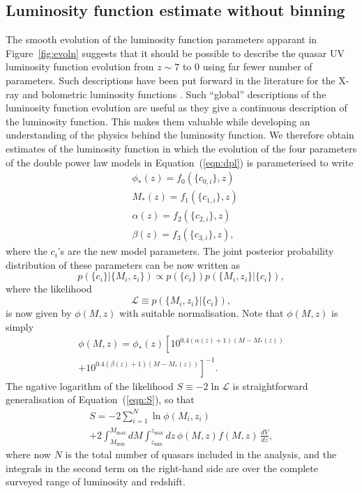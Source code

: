 \documentclass[a4paper,fleqn,usenatbib]{mnras}
\begin{document}
\subsection{Luminosity function estimate without binning}

The smooth evolution of the luminosity function parameters apparant in
Figure~\ref{fig:evoln} suggests that it should be possible to describe
the quasar UV luminosity function evolution from $z\sim 7$ to $0$
using far fewer number of parameters.  Such descriptions have been put
forward in the literature for the X-ray and bolometric luminosity
functions \citep[e.g.,][]{2007ApJ...654..731H, 2015MNRAS.451.1892A}.
Such ``global'' descriptions of the luminosity function evolution are
useful as they give a continuous description of the luminosity
function.  This makes them valuable while developing an understanding
of the physics behind the luminosity function. We therefore obtain
estimates of the luminosity function in which the evolution of the
four parameters of the double power law models in
Equation~(\ref{eqn:dpl}) is parameterised to write
\begin{align}
  &\phi_*(z) = f_0(\{c_{0,i}\}, z)\nonumber\\
  &M_*(z) = f_1(\{c_{1,i}\}, z)\nonumber\\
  &\alpha(z) = f_2(\{c_{2,i}\}, z)\nonumber\\
  &\beta(z) = f_3(\{c_{3,i}\}, z),
\label{eqn:global}
\end{align}
where the $c_i$'s are the new model parameters.  The joint posterior
probability distribution of these parameters can be now written as
\begin{equation}
  p(\{c_i\} | \{M_i, z_i\}) \propto p(\{c_i\})p(\{M_i, z_i\} | \{c_i\}),
\end{equation}
where the likelihood 
\begin{equation}
  \mathcal{L}\equiv p(\{M_i, z_i\} | \{c_i\}),
\end{equation}
is now given by $\phi(M,z)$ with suitable normalisation.  Note that
$\phi(M,z)$ is simply 
\begin{multline}
  \phi(M,z) = \phi_*(z) \left[10^{0.4(\alpha(z)+1)(M-M_*(z))}\right. \\ \left.+ 10^{0.4(\beta(z)+1)(M-M_*(z))}\right]^{-1}.
\end{multline}
The ngative logarithm of the likelihood $S\equiv -2\ln\mathcal{L}$ is
straightforward generalisation of Equation~(\ref{eqn:S}), so that
\begin{multline}
  S = -2\sum_{i=1}^N\ln\phi(M_i, z_i)\\+2\int_{M_\mathrm{min}}^{M_\mathrm{max}}dM\int_{z_\mathrm{min}}^{z_\mathrm{max}}dz\, \phi(M,z) f(M, z)\,\frac{dV}{dz},
  \label{eqn:S2}
\end{multline}
where now $N$ is the total number of quasars included in the analysis,
and the integrals in the second term on the right-hand side are over
the complete surveyed range of luminosity and redshift.
\end{document}
